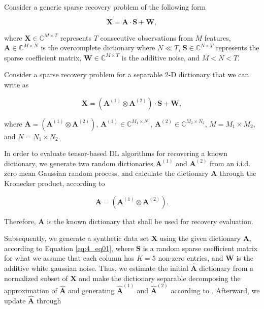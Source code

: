 Consider a generic sparse recovery problem of the following form

\begin{equation}\label{eq:4_eq01}
	\boldsymbol{X} = \boldsymbol{A} \cdot \boldsymbol{S} + \boldsymbol{W},
\end{equation}

where $\boldsymbol{X} \in \mathbb{C}^{M \times T}$ represents $T$ consecutive observations from $M$ features, $\boldsymbol{A} \in \mathbb{C}^{M \times N}$ is the overcomplete dictionary where $N \ll T$, $\boldsymbol{S} \in \mathbb{C}^{N \times T}$ represents the sparse coefficient matrix, $\boldsymbol{W} \in \mathbb{C}^{M \times T}$ is the additive noise, and $M < N < T$.

Consider a sparse recovery problem for a separable 2-D dictionary that we can write as

\begin{equation}\label{eq:4_eq02}
	\boldsymbol{X} = (\boldsymbol{A}^{(1)} \otimes \boldsymbol{A}^{(2)}) \cdot \boldsymbol{S} + \boldsymbol{W},
\end{equation}

where $\boldsymbol{A} = (\boldsymbol{A}^{(1)} \otimes \boldsymbol{A}^{(2)})$, $\boldsymbol{A}^{(1)} \in \mathbb{C}^{M_1 \times N_1}$, $\boldsymbol{A}^{(2)} \in \mathbb{C}^{M_2 \times N_2}$, $M = M_1 \times M_2$, and $N = N_1 \times N_2$.

In order to evaluate tensor-based DL algorithms for recovering a known dictionary, we generate two random dictionaries $\boldsymbol{A}^{(1)}$ and $\boldsymbol{A}^{(2)}$ from an i.i.d. zero mean Gaussian random process, and calculate the dictionary $\boldsymbol{A}$ through the Kronecker product, according to 

\begin{equation}\label{eq:4_eq03}
	\boldsymbol{A} = (\boldsymbol{A}^{(1)} \otimes \boldsymbol{A}^{(2)}).
\end{equation}

Therefore, $\boldsymbol{A}$ is the known dictionary that shall be used for recovery evaluation. 

Subsequently, we generate a synthetic data set $\boldsymbol{X}$ using the given dictionary $\boldsymbol{A}$, according to Equation \ref{eq:4_eq01}, where $\boldsymbol{S}$ is a random sparse coefficient matrix for what we assume that each column has $K = 5$ non-zero entries, and $\boldsymbol{W}$ is the additive white gaussian noise. Thus, we estimate the initial $\boldsymbol{\hat{A}}$ dictionary from a normalized subset of $\boldsymbol{X}$ and make the dictionary separable decomposing the approximation of $\boldsymbol{\hat{A}}$ and generating $\boldsymbol{\hat{A}}^{(1)}$ and $\boldsymbol{\hat{A}}^{(2)}$ according to \cite{van1993approximation}. Afterward, we update $\boldsymbol{\hat{A}}$ through 

